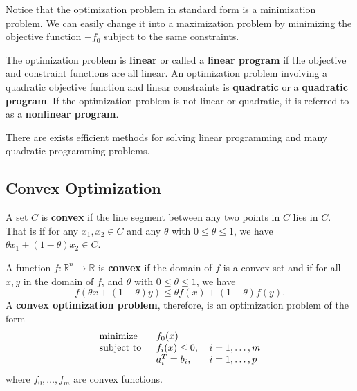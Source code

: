 Notice that the optimization problem in standard form is a minimization problem.  We can easily change it into a maximization problem by minimizing the objective function $-f_0$ subject to the same constraints.

The optimization problem is {\color{tiananmen}\textbf{linear}} or called a {\color{tiananmen}\textbf{linear program}} if the objective and constraint functions are all linear. An optimization problem involving a quadratic objective function and linear constraints is {\color{tiananmen}\textbf{quadratic}} or a {\color{tiananmen}\textbf{quadratic program}}. If the optimization problem is not linear or quadratic, it is referred to as a {\color{tiananmen}\textbf{nonlinear program}}.

There are exists efficient methods for solving linear programming and many quadratic programming problems.

\subsection{Convex Optimization}

A set {\color{baystate}$C$} is {\color{tiananmen}\textbf{convex}} if the line segment between any two points in $C$ lies in $C$. That is {\color{baystate}if for any $x_1,x_2\in C$ and any $\theta$ with $0\leq\theta\leq 1$, we have $\theta x_1+(1-\theta)x_2\in C$}.

A function {\color{baystate}$f : \mathbb{R}^n\rightarrow\mathbb{R}$} is {\color{tiananmen}\textbf{convex}} if the domain of $f$ is a convex set and if for all $x,y$ in the domain of $f$, and $\theta$ with $0\leq\theta\leq 1$, we have
{\color{baystate}
	\begin{equation}
		f\left(\theta x+\left(1-\theta\right)y\right)\leq\theta f(x)+(1-\theta)f(y).
		\label{eqn:Convexity}
	\end{equation}
}
A {\color{tiananmen} \textbf{convex optimization problem}}, therefore, is an optimization problem of the form
{\color{baystate}
	\begin{equation}
		\begin{tabular}{lll}
			\text{minimize }   & $f_0(x)$          & \\
			\text{subject to } & $f_i(x)\leq 0$, & $i=1,\ldots, m$\\
			& $a_i^T = b_i$,      & $i=1,\ldots, p$
		\end{tabular}\label{ConvexOptimization}
	\end{equation}
	where $f_0,\ldots,f_m$ are convex functions.
}

